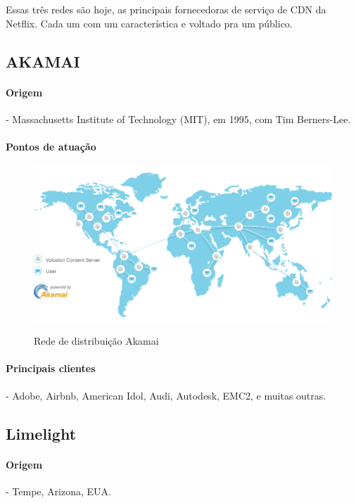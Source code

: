 Essas tr\^es redes s\~ao hoje, as principais fornecedoras de servi\c{c}o de CDN da Netflix. Cada um com um caracter\'istica e voltado pra um p\'ublico.
\subsection{AKAMAI}
\paragraph{Origem}- Massachusetts Institute of Technology (MIT), em 1995, com Tim Berners-Lee.
\paragraph{Pontos de atua\c{c}\~ao}
\begin{figure}[H]
\caption{Rede de distribui\c{c}\~ao Akamai}
\includegraphics[width=12cm]{Figuras/akamai_map.png} 
\label{figura:akamai_map}
\end{figure}
\paragraph{Principais clientes}- Adobe, Airbnb, American Idol, Audi, Autodesk, EMC2, e muitas outras.
\subsection{Limelight}
\paragraph{Origem}- Tempe, Arizona, EUA.
